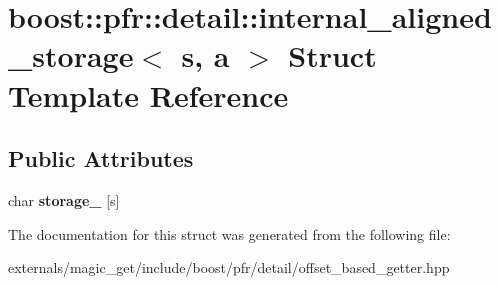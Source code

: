 \hypertarget{structboost_1_1pfr_1_1detail_1_1internal__aligned__storage}{}\section{boost\+:\+:pfr\+:\+:detail\+:\+:internal\+\_\+aligned\+\_\+storage$<$ s, a $>$ Struct Template Reference}
\label{structboost_1_1pfr_1_1detail_1_1internal__aligned__storage}
\subsection*{Public Attributes}
\begin{DoxyCompactItemize}
\item 
\mbox{\label{structboost_1_1pfr_1_1detail_1_1internal__aligned__storage_a13088c050f6bd9704c020fbccbd415f3}} 
char {\bfseries storage\+\_\+} \mbox{[}s\mbox{]}
\end{DoxyCompactItemize}


The documentation for this struct was generated from the following file\+:\begin{DoxyCompactItemize}
\item 
externals/magic\+\_\+get/include/boost/pfr/detail/offset\+\_\+based\+\_\+getter.\+hpp\end{DoxyCompactItemize}

